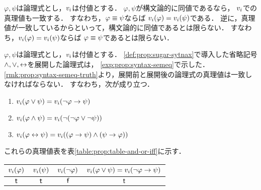 \begin{myRemark}[構文論的同値と真理値]
  \label{rmk:prop:syntax-semeq-truth}
  $\varphi, \psi$は論理式とし，$v_i$は付値とする．
  $\varphi,\psi$が構文論的に同値であるなら，
  $v_i$での真理値も一致する．
  すなわち，$\varphi \equiv \psi$ならば
  $v_i(\varphi) = v_i(\psi)$である．
  逆に，真理値が一致しているからといって，構文論的に同値であるとは限らない．
  すなわち，$v_i(\varphi) = v_i(\psi)$ならば
  $\varphi \equiv \psi$であるとは限らない．
\end{myRemark}

\begin{myCorollary}
  \label{cor:prop:valuation-sugar-syntax}
  $\varphi, \psi$は論理式とし，$v_i$は付値とする．
  \ref{def:prop:sugar-sytnax}で導入した省略記号$\land, \lor, \leftrightarrow$を展開した論理式は，
  \ref{exp:prop:syntax-semeq}で示した．
  \ref*{rmk:prop:syntax-semeq-truth}より，展開前と展開後の論理式の真理値は一致しなければならない．
  すなわち，次が成り立つ．
  \begin{enumerate}
    \item $v_i(\varphi \lor \psi) = v_i(\lnot \varphi \to \psi)$
    \item $v_i(\varphi \land \psi) = v_i(\lnot(\lnot\varphi \lor \lnot\psi))$
    \item $v_i(\varphi \leftrightarrow \psi) = v_i((\varphi \to \psi) \land (\psi \to \varphi))$
  \end{enumerate}
  これらの真理値表を表\ref{table:prop:table-and-or-iff}に示す．
  \begin{table}[H]
    \begin{subtable}{\linewidth}
      \centering
      \begin{tabular}{|c|c|c|c|}\hline
        $v_i(\varphi)$ & $v_i(\psi)$ & $v_i(\lnot\varphi)$ & $v_i(\varphi \lor \psi) = v_i(\lnot \varphi \to \psi)$ \\ \hline
        $\mathsf{t}$                                  & $\mathsf{t}$                               & $\mathsf{f}$                                      & $\mathsf{t}$                                                                                                      \\ \hline

\end{tabular}
\end{subtable}
\end{table}
\end{myCorollary}
